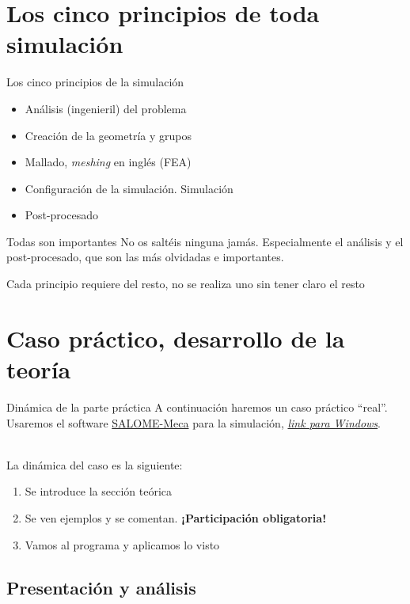 \documentclass[12pt]{beamer}
\begin{document}
\section{Los cinco principios de toda simulación}

\begin{frame}{Los cinco principios de la simulación}
	\begin{itemize}
		\item Análisis (ingenieril) del problema
		\item Creación de la geometría y grupos
		\item Mallado, \textit{meshing} en inglés (FEA)
		\item Configuración de la simulación. Simulación
		\item Post-procesado
	\end{itemize} \pause
	\begin{block}{Todas son importantes}
		No os saltéis ninguna jamás. Especialmente el análisis y el post-procesado, que son las más olvidadas e importantes.
	\end{block}
	Cada principio requiere del resto, no se realiza uno sin tener claro el resto
\end{frame}

\section{Caso práctico, desarrollo de la teoría}

\begin{frame}{Dinámica de la parte práctica}
	A continuación haremos un caso práctico ``real''. Usaremos el software \href{https://code-aster.org/spip.php?article303}{SALOME-Meca} para la simulación, \href{https://code-aster-windows.com/download/}{\textit{link para Windows}}. \\~
	
	La dinámica del caso es la siguiente:
	\begin{enumerate}
		\item Se introduce la sección teórica
		\item Se ven ejemplos y se comentan. \textbf{¡Participación obligatoria!}
		\item Vamos al programa y aplicamos lo visto
	\end{enumerate}
\end{frame}

\subsection{Presentación y análisis}
\end{document}
